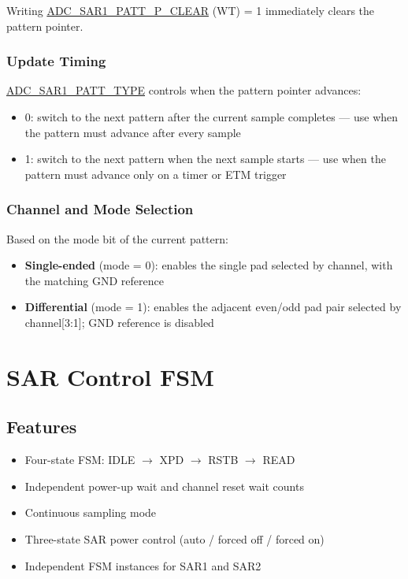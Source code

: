 \documentclass[main\_\_EN.tex]{subfiles}
\begin{document}
Writing \hyperref[fielddesc:ADCSAR1PATTPCLEAR]{ADC\_SAR1\_PATT\_P\_CLEAR} (WT) = 1 immediately clears the pattern pointer.

\subsubsection{Update Timing}
\hyperref[fielddesc:ADCSAR1PATTTYPE]{ADC\_SAR1\_PATT\_TYPE} controls when the pattern pointer advances:
\begin{itemize}
    \item 0: switch to the next pattern after the current sample completes --- use when the pattern must advance after every sample
    \item 1: switch to the next pattern when the next sample starts --- use when the pattern must advance only on a timer or ETM trigger
\end{itemize}

\subsubsection{Channel and Mode Selection}
\label{sec:adc-pattern-mode-channel}
Based on the mode bit of the current pattern:
\begin{itemize}
    \item \textbf{Single-ended} (mode = 0): enables the single pad selected by channel, with the matching GND reference
    \item \textbf{Differential} (mode = 1): enables the adjacent even/odd pad pair selected by channel[3:1]; GND reference is disabled
\end{itemize}


\section{SAR Control FSM}
\label{sec:adc-fsm}

\subsection{Features}
\begin{itemize}
    \item Four-state FSM: IDLE $\to$ XPD $\to$ RSTB $\to$ READ
    \item Independent power-up wait and channel reset wait counts
    \item Continuous sampling mode
    \item Three-state SAR power control (auto / forced off / forced on)
    \item Independent FSM instances for SAR1 and SAR2
\end{itemize}
\end{document}
